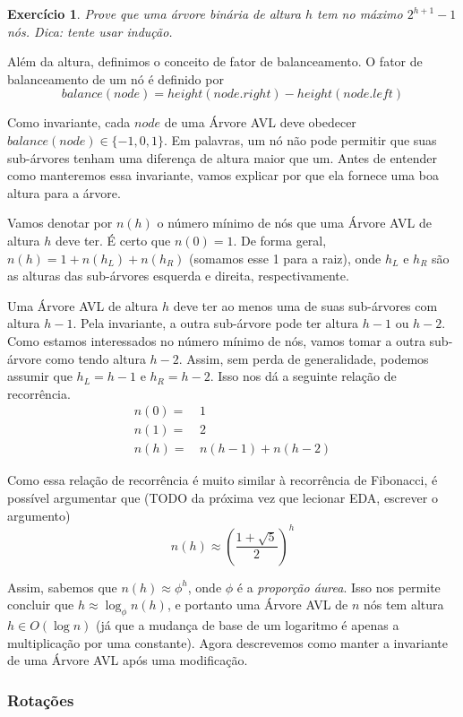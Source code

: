 \documentclass[11pt]{article}
\newtheorem{exercicio}{Exercício}
\begin{document}
\begin{exercicio}
Prove que uma árvore binária de altura \(h\) tem no máximo \(2^{h +
   1} - 1\) nós.  Dica: tente usar indução.
\end{exercicio}

Além da altura, definimos o conceito de fator de balanceamento.  O
fator de balanceamento de um nó é definido por
$$
   balance(node) = height(node.right) - height(node.left)
   $$

Como invariante, cada \(node\) de uma Árvore AVL deve obedecer
\(balance(node) \in \{-1, 0, 1\}\).  Em palavras, um nó não pode
permitir que suas sub-árvores tenham uma diferença de altura maior
que um.  Antes de entender como manteremos essa invariante, vamos
explicar por que ela fornece uma boa altura para a árvore.

Vamos denotar por \(n(h)\) o número mínimo de nós que uma Árvore AVL
de altura \(h\) deve ter.  É certo que \(n(0) = 1\).  De forma geral,
\(n(h) = 1 + n(h_L) + n(h_R)\) (somamos esse 1 para a raiz), onde
\(h_L\) e \(h_R\) são as alturas das sub-árvores esquerda e direita,
respectivamente.

Uma Árvore AVL de altura \(h\) deve ter ao menos uma de suas
sub-árvores com altura \(h - 1\).  Pela invariante, a outra
sub-árvore pode ter altura \(h - 1\) ou \(h - 2\). Como estamos
interessados no número mínimo de nós, vamos tomar a outra
sub-árvore como tendo altura \(h - 2\). Assim, sem perda de
generalidade, podemos assumir que \(h_L = h - 1\) e \(h_R = h - 2\).
Isso nos dá a seguinte relação de recorrência.
\begin{align}
n(0) =&\, 1 \\
n(1) =&\, 2 \\
n(h) =&\, n(h - 1) + n(h - 2)
\end{align}

Como essa relação de recorrência é muito similar à recorrência de
Fibonacci, é possível argumentar que (TODO da próxima vez que
lecionar EDA, escrever o argumento)
$$
   n(h) \approx \left(\frac{1 + \sqrt{5}}{2}\right)^h
   $$

Assim, sabemos que \(n(h) \approx \phi^h\), onde \(\phi\) é a
\emph{proporção áurea}.  Isso nos permite concluir que \(h \approx
   \log_\phi n(h)\), e portanto uma Árvore AVL de \(n\) nós tem altura \(h
   \in O(\log n)\) (já que a mudança de base de um logaritmo é apenas a
multiplicação por uma constante).  Agora descrevemos como manter a
invariante de uma Árvore AVL após uma modificação.

\subsubsection{Rotações}
\label{sec:org9cc6d7f}
\end{document}
